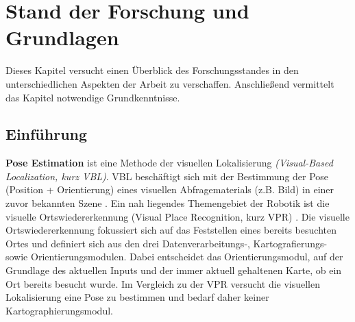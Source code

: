 \pagebreak
\section{Stand der Forschung und Grundlagen}

Dieses Kapitel versucht einen Überblick des Forschungsstandes in den unterschiedlichen Aspekten der Arbeit zu verschaffen. Anschließend vermittelt das Kapitel notwendige Grundkenntnisse.

\subsection{Einführung}

\textbf{Pose Estimation} ist eine Methode der visuellen Lokalisierung \textit{(Visual-Based Localization, kurz VBL)}. VBL beschäftigt sich mit der Bestimmung der Pose (Position + Orientierung) eines visuellen Abfragematerials (z.B. Bild) in einer zuvor bekannten Szene  \cite{piascoSurveyVisualBasedLocalization2018}.
Ein nah liegendes Themengebiet der Robotik ist die visuelle Ortswiedererkennung (Visual Place Recognition, kurz VPR) \cite{lowryVisualPlaceRecognition2016}. Die visuelle Ortswiedererkennung fokussiert sich auf das Feststellen eines bereits besuchten Ortes und definiert sich aus den drei Datenverarbeitungs-, Kartografierungs- sowie Orientierungsmodulen. Dabei entscheidet das Orientierungsmodul, auf der Grundlage des aktuellen Inputs und der immer aktuell gehaltenen Karte, ob ein Ort bereits besucht wurde. Im Vergleich zu der VPR versucht die visuellen Lokalisierung eine Pose zu bestimmen und bedarf daher keiner Kartographierungsmodul.




